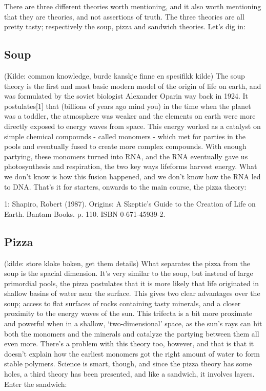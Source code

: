 There are three different theories worth mentioning, and it also worth mentioning that they are theories, and not assertions of truth. The three theories are all pretty tasty; respectively the soup, pizza and sandwich theories. Let’s dig in:

\subsection{Soup}
(Kilde: common knowledge, burde kanskje finne en spesifikk kilde)
The soup theory is the first and most basic modern model of the origin of life on earth, and was formulated by the soviet biologist Alexander Oparin way back in 1924. It postulates[1] that (billions of years ago mind you) in the time when the planet was a toddler, the atmosphere was weaker and the elements on earth were more directly exposed to energy waves from space. This energy worked as a catalyst on simple chemical compounds - called monomers - which met for parties in the pools and eventually fused to create more complex compounds. With enough partying, these monomers turned into RNA, and the RNA eventually gave us photosynthesis and respiration, the two key ways lifeforms harvest energy. What we don’t know is how this fusion happened, and we don’t know how the RNA led to DNA. That’s it for starters, onwards to the main course, the pizza theory: 

1:  Shapiro, Robert (1987). Origins: A Skeptic's Guide to the Creation of Life on Earth. Bantam Books. p. 110. ISBN 0-671-45939-2.

\subsection{Pizza} (kilde: store kloke boken, get them details)
What separates the pizza from the soup is the spacial dimension. It’s very similar to the soup, but instead of large primordial pools, the pizza postulates that it is more likely that life originated in shallow basins of water near the surface. This gives two clear advantages over the soup; access to flat surfaces of rocks containing tasty minerals, and a closer proximity to the energy waves of the sun. This trifecta is a bit more proximate and powerful when in a shallow, ‘two-dimensional’ space, as the sun’s rays can hit both the monomers and the minerals and catalyze the partying between them all even more. There’s a problem with this theory too, however, and that is that it doesn’t explain how the earliest monomers got the right amount of water to form stable polymers. Science is smart, though, and since the pizza theory has some holes, a third theory has been presented, and like a sandwich, it involves layers. Enter the sandwich:

